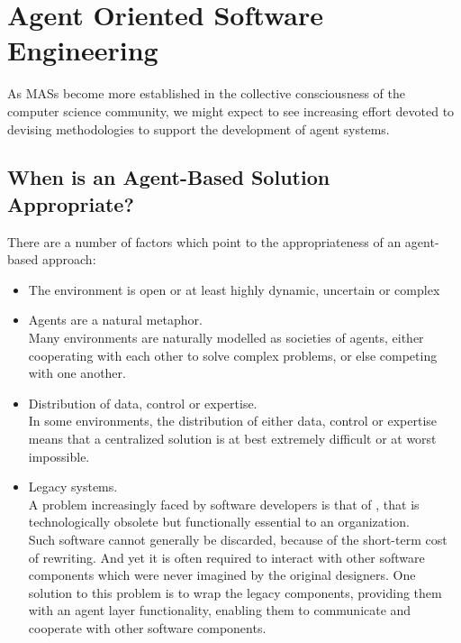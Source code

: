 

\chapter{Agent Oriented Software Engineering}
\minitoc

As MASs become more established in the collective consciousness of the computer science community, we might expect to see increasing effort devoted to devising methodologies to support the development of agent systems.

\section{When is an Agent-Based Solution Appropriate?}

There are a number of factors which point to the appropriateness of an agent-based approach:
\begin{itemize}
\item The environment is open or at least highly dynamic, uncertain or complex
\item Agents are a natural metaphor.\\
Many environments are naturally modelled as societies of agents, either cooperating with each other to solve complex problems, or else competing with one another.
\item Distribution of data, control or expertise.\\
In some environments, the distribution of either data, control or expertise means that a centralized solution is at best extremely difficult or at worst impossible.
\item Legacy systems.\\
A problem increasingly faced by software developers is that of , that is technologically obsolete but functionally essential to an organization.\\
Such software cannot generally be discarded, because of the short-term cost of rewriting. And yet it is often required to interact with other software components which were never imagined by the original designers. One solution to this problem is to wrap the legacy components, providing them with an agent layer functionality, enabling them to communicate and cooperate with other software components.
\end{itemize}

